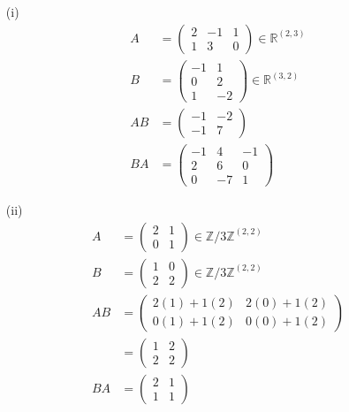 \documentclass[11pt]{report}
\newcommand*\Zb[1] {\mathbb{#1}}
\begin{document}
\begin{itemize}
 \item[(i)] 
\begin{align}
A &= \begin{pmatrix} 2 & -1 & 1 \\ 1 & 3 & 0\end{pmatrix} \in \Zb{R}^{(2,3)} \\
B &= \begin{pmatrix} -1 & 1 \\ 0 & 2 \\ 1 & -2\end{pmatrix} \in \Zb{R}^{(3,2)} \\
AB &= \begin{pmatrix} -1 & -2 \\ -1 & 7 \end{pmatrix} \\
BA &= \begin{pmatrix} -1 & 4 & -1 \\ 2 & 6 & 0 \\ 0 & -7 & 1\end{pmatrix}
\end{align}
 \item[(ii)]
\begin{align}
A &= \begin{pmatrix} 2 & 1 \\ 0 & 1 \end{pmatrix} \in \Zb{Z} / 3\Zb{Z}^{(2,2)} \\
B &= \begin{pmatrix} 1 & 0 \\ 2 & 2 \end{pmatrix} \in \Zb{Z} / 3\Zb{Z}^{(2,2)} \\
AB &= \begin{pmatrix} 2(1) + 1(2) & 2(0) + 1(2) \\ 0(1) + 1(2) & 0(0) + 1(2)\end{pmatrix} \\
 &= \begin{pmatrix} 1 & 2 \\ 2 & 2 \end{pmatrix} \\
BA &= \begin{pmatrix} 2 & 1 \\ 1 & 1\end{pmatrix} 
\end{align}
\end{itemize}
\end{document}
